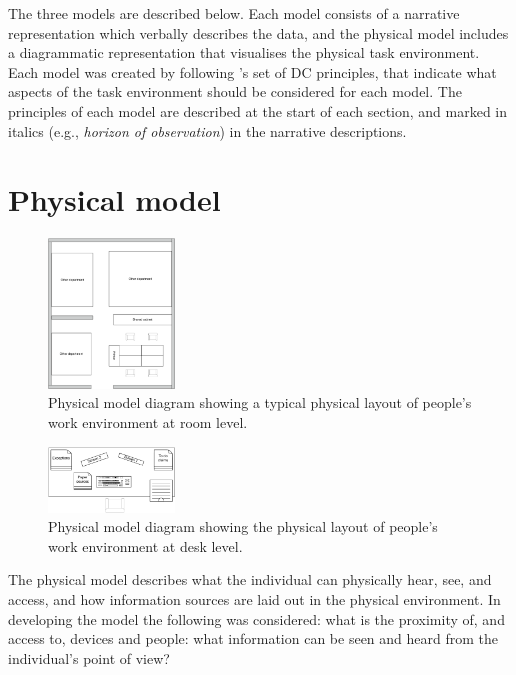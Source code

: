 The three models are described below. Each model consists of a narrative representation which verbally describes the data, and the physical model includes a diagrammatic representation that visualises the physical task environment. Each model was created by following \citet{Furniss2006}'s set of DC principles, that indicate what aspects of the task environment should be considered for each model. The principles of each model are described at the start of each section, and marked in italics (e.g., \textit{horizon of observation}) in the narrative descriptions.

\section{Physical model}
\begin{figure}[!ht]
\centering
\includegraphics[width=0.3\textwidth]{images/ch12/ch12_physmodroom.pdf}
\caption[Study 2 Physical room model]{Physical model diagram showing a typical physical layout of people's work environment at room level.}
\vspace{-9pt}
\label{fig:ch12_physmodroom}
\end{figure}

\begin{figure}[!ht]
\centering
\includegraphics[width=0.3\textwidth]{images/ch12/ch12_physmoddesk.pdf}
\caption[Study 2 Physical desk model]{Physical model diagram showing the physical layout of people's work environment at desk level.}
\vspace{-9pt}
\label{fig:ch12_physmodroom}
\end{figure}

The physical model describes what the individual can physically hear, see, and access, and how information sources are laid out in the physical environment. In developing the model the following was considered: what is the proximity of, and access to, devices and people: what information can be seen and heard from the individual's point of view?

